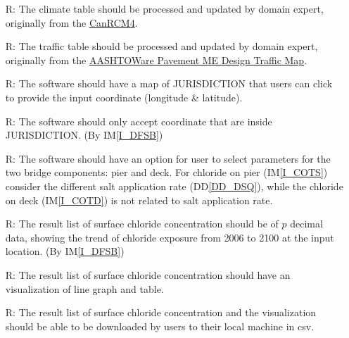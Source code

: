 \documentclass[12pt]{article}
\newcommand{\ddref}[1]{DD\ref{#1}}
\newcommand{\iref}[1]{IM\ref{#1}}
\newcounter{reqnum} %
\begin{document}
\begin{itemize}
\item[R\refstepcounter{reqnum}\thereqnum \label{R_InputClimate}:] The climate table should be processed and updated by domain expert, originally from the \href{https://climate-modelling.canada.ca/climatemodeldata/canrcm/CanRCM4/index.shtml}{CanRCM4}.
 
\item[R\refstepcounter{reqnum}\thereqnum \label{R_InputTraffic}:] The traffic table should be processed and updated by domain expert, originally from the \href{https://icorridor-mto-on-ca.hub.arcgis.com/apps/50798e771bd0440dbc96fd85d8fde9a5/explore}{AASHTOWare Pavement ME Design Traffic Map}.
\item[R\refstepcounter{reqnum}\thereqnum \label{R_InputMap}:] The software should have a map of JURISDICTION that users can click to provide the input coordinate (longitude \& latitude).

\item[R\refstepcounter{reqnum}\thereqnum \label{R_Inputs}:] The software should only accept coordinate that are inside JURISDICTION. (By \iref{I_DFSB})

\item[R\refstepcounter{reqnum}\thereqnum \label{R_Parameter}:] The software should have an option for user to select parameters for the two bridge components: pier and deck. For chloride on pier (\iref{I_COTS}) consider the different salt application rate (\ddref{DD_DSQ}), while the chloride on deck (\iref{I_COTD}) is not related to salt application rate.

\item[R\refstepcounter{reqnum}\thereqnum \label{R_OutputInputs}:] The result list of surface chloride concentration should be of $p$ decimal data, showing the trend of chloride exposure from 2006 to 2100 at the input location. (By \iref{I_DFSB})

\item[R\refstepcounter{reqnum}\thereqnum \label{R_OutputVisualization}:] The result list of surface chloride concentration should have an visualization of line graph and table.

\item[R\refstepcounter{reqnum}\thereqnum \label{R_OutputDownload}:] The result list of surface chloride concentration and the visualization should be able to be downloaded by users to their local machine in csv. 


\end{itemize}
\end{document}

